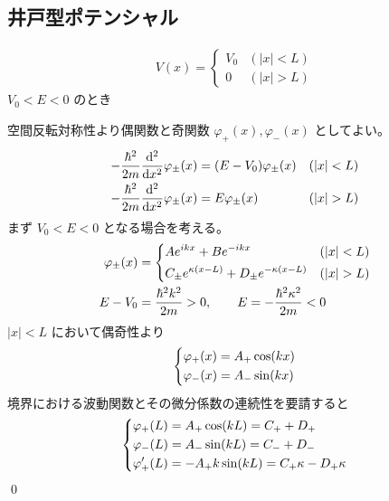 \documentclass[uplatex,dvipdfmx,a4paper,11pt]{jlreq}
\makeatletter
\theoremstyle{definition}
\renewenvironment{proof}[1][\proofname]{\par
  \normalfont
  \topsep6\p@\@plus6\p@ \trivlist
  \item[\hskip\labelsep{\bfseries #1}\@addpunct{\bfseries}]\ignorespaces\quad\par
}{%
  \qed\endtrivlist\@endpefalse
}
\renewcommand\proofname{証明}
\makeatother
\begin{document}
\subsection{井戸型ポテンシャル}
\begin{proposition}
  \begin{align}
    V(x) =
    \begin{cases}
      V_0 & (|x| < L) \\
      0   & (|x| > L)
    \end{cases}
  \end{align}
  $V_0 < E < 0$ のとき
\end{proposition}
\begin{proof}
  空間反転対称性より偶関数と奇関数 $\varphi_+(x), \varphi_-(x)$ としてよい。
  \begin{align}
    -\frac{\hbar^2}{2m}\dv[2]{x}\varphi_{\pm}(x) & = (E - V_0)\varphi_{\pm}(x) & (|x| < L) \\
    -\frac{\hbar^2}{2m}\dv[2]{x}\varphi_{\pm}(x) & = E\varphi_{\pm}(x)         & (|x| > L)
  \end{align}
  まず $V_0 < E < 0$ となる場合を考える。
  \begin{align}
    \varphi_{\pm}(x) & = \begin{dcases}
                           Ae^{ikx} + Be^{-ikx}                               & (|x| < L) \\
                           C_\pm e^{\kappa(x - L)} + D_\pm e^{-\kappa(x - L)} & (|x| > L)
                         \end{dcases} \\
    E - V_0          & = \frac{\hbar^2k^2}{2m} > 0, \qquad E = -\frac{\hbar^2\kappa^2}{2m} < 0
  \end{align}
  $|x| < L$ において偶奇性より
  \begin{align}
    \begin{dcases}
      \varphi_+(x) = A_+\cos(kx) \\
      \varphi_-(x) = A_-\sin(kx)
    \end{dcases}
  \end{align}
  境界における波動関数とその微分係数の連続性を要請すると
  \begin{align}
    \begin{dcases}
      \varphi_+(L) = A_+\cos(kL) = C_+ + D_+                \\
      \varphi_-(L) = A_-\sin(kL) = C_- + D_-                \\
      \varphi_+'(L) = -A_+k\sin(kL) = C_+\kappa - D_+\kappa \\

\end{dcases}
\end{align}
\end{proof}
\end{document}
